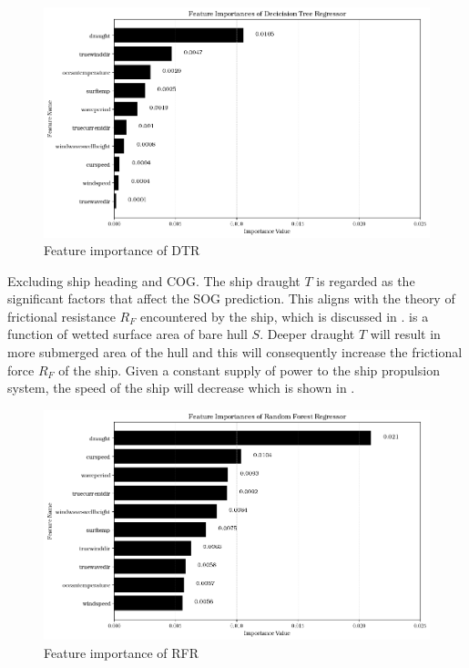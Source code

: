 \begin{figure}[h]
    \centering
        \includegraphics[width=.9\textwidth]{02_figures/dtr_ftr_importance_nodir.png}
        \caption{Feature importance of DTR}
        \label{fig:ftr_impo_dtr}
\end{figure}

Excluding ship heading and COG. The ship draught $T$ is regarded as the significant factors that affect the SOG prediction. This aligns with the theory of frictional resistance $R_F$ encountered by the ship, which is discussed in .  is a function of wetted surface area of bare hull $S$. Deeper draught $T$ will result in more submerged area of the hull and this will consequently increase the frictional force $R_F$ of the ship. Given a constant supply of power to the ship propulsion system, the speed of the ship will decrease which is shown in .\\

\begin{figure}[h]
    \centering
        \includegraphics[width=.9\textwidth]{02_figures/rfr_ftr_importance_nodir.png}
        \caption{Feature importance of RFR}
        \label{fig:ftr_impo_rfr}
\end{figure}

